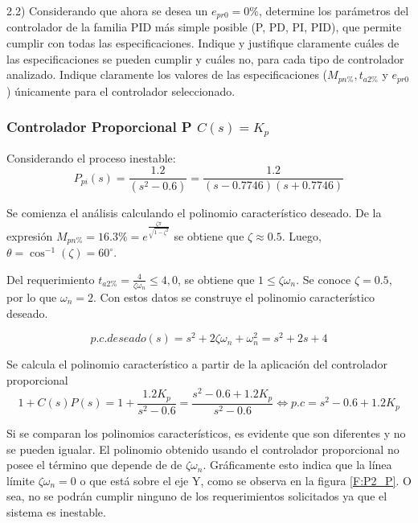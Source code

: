 \documentclass{report}
\begin{document}
2.2) Considerando que ahora se desea un \(e_{pr0}=0\%\), determine los parámetros del controlador de la familia PID más simple posible (P, PD, PI, PID), que permite cumplir con todas
las especificaciones. Indique y justifique claramente cuáles de las especificaciones se pueden cumplir y cuáles no, para cada tipo de controlador analizado. Indique claramente los valores de
las especificaciones (\(M_{pn\%}, t_{a2\%}\) y \(e_{pr0}\)) únicamente para el controlador seleccionado.

\subsubsection{Controlador Proporcional P \(C(s) = K_p\)}

Considerando el proceso inestable:
\begin{equation*}
    P_{pi}(s) = \frac{1.2}{(s^2-0.6)} = \frac{1.2}{(s-0.7746)(s+0.7746)} 
\label{Eq:9}
\end{equation*}

Se comienza el análisis calculando el polinomio característico deseado. De la expresión \(M_{pn\%} = 16.3\% = e^\frac{\zeta \pi}{\sqrt{1-\zeta ^2}}\) se obtiene que \(\zeta \approx 0.5\). Luego, 
\(\theta = \cos^{-1}(\zeta) = 60^{\circ}\).

Del requerimiento \(t_{a2\%} = \frac{4}{\zeta \omega_n} \leqslant 4,0\), se obtiene que \(1 \leqslant \zeta \omega_n\). Se conoce \(\zeta = 0.5\), por lo que \(\omega_n = 2\). Con estos datos 
se construye el polinomio característico deseado.

\begin{equation*}
    p.c.deseado(s) = s^2+2\zeta \omega_n + \omega_n^2 = s^2+2s+4 
\label{Eq:10}
\end{equation*}

Se calcula el polinomio característico a partir de la aplicación del controlador proporcional \\

\begin{equation*}
    1 + C(s)P(s) =  1 + \frac{1.2 K_p}{s^2-0.6} = \frac{s^2-0.6 + 1.2 K_p}{s^2-0.6} \Leftrightarrow p.c = s^2-0.6 + 1.2 K_p
    \label{Eq:11}
\end{equation*}


Si se comparan los polinomios característicos, es evidente que son diferentes y no se pueden igualar. El polinomio obtenido usando el controlador proporcional no posee el término que depende de 
de \(\zeta \omega_n\). Gráficamente esto indica que la línea límite \(\zeta \omega_n = 0\) o que está sobre el eje Y, como se observa en la figura \ref{F:P2_P}. O sea, no se podrán cumplir ninguno de los requerimientos solicitados ya que 
el sistema es inestable.
\end{document}
